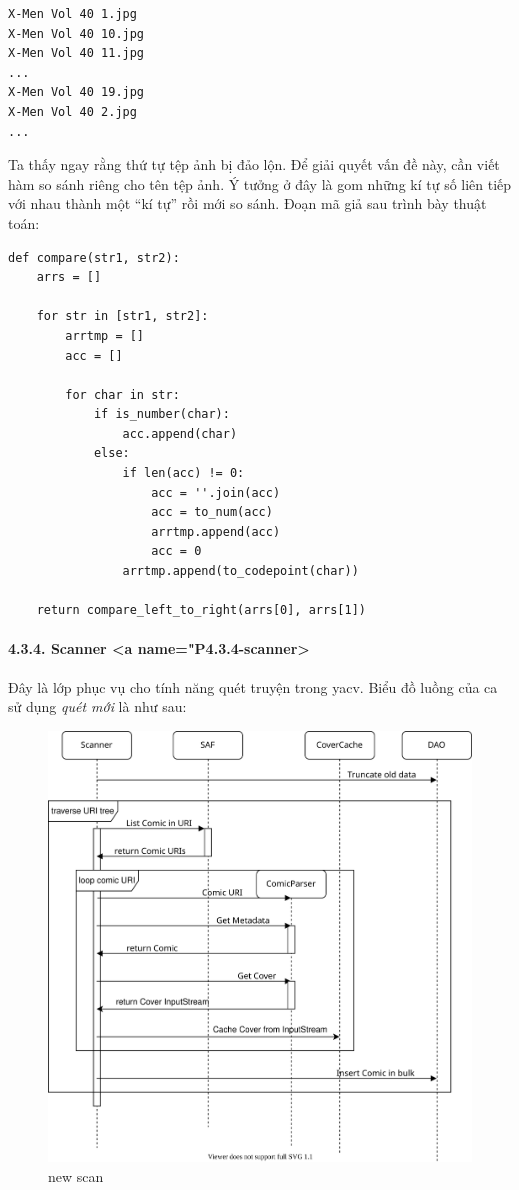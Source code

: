 \documentclass[
]{article}
\begin{document}
\begin{verbatim}
X-Men Vol 40 1.jpg
X-Men Vol 40 10.jpg
X-Men Vol 40 11.jpg
...
X-Men Vol 40 19.jpg
X-Men Vol 40 2.jpg
...
\end{verbatim}

Ta thấy ngay rằng thứ tự tệp ảnh bị đảo lộn. Để giải quyết vấn đề này,
cần viết hàm so sánh riêng cho tên tệp ảnh. Ý tưởng ở đây là gom những
kí tự số liên tiếp với nhau thành một ``kí tự'' rồi mới so sánh. Đoạn mã
giả sau trình bày thuật toán:

\begin{verbatim}
def compare(str1, str2):
    arrs = []

    for str in [str1, str2]:
        arrtmp = []
        acc = []

        for char in str:
            if is_number(char):
                acc.append(char)
            else:
                if len(acc) != 0:
                    acc = ''.join(acc)
                    acc = to_num(acc)
                    arrtmp.append(acc)
                    acc = 0
                arrtmp.append(to_codepoint(char))

    return compare_left_to_right(arrs[0], arrs[1])
\end{verbatim}

\hypertarget{scanner-a-namep4.3.4-scanner}{%
\paragraph{4.3.4. Scanner \textless a
name="P4.3.4-scanner\textgreater{}}\label{scanner-a-namep4.3.4-scanner}}

Đây là lớp phục vụ cho tính năng quét truyện trong yacv. Biểu đồ luồng
của ca sử dụng \emph{quét mới} là như sau:

\begin{figure}
\centering
\includegraphics{../images/scan_new_sequence.svg}
\caption{new scan}
\end{figure}
\end{document}

